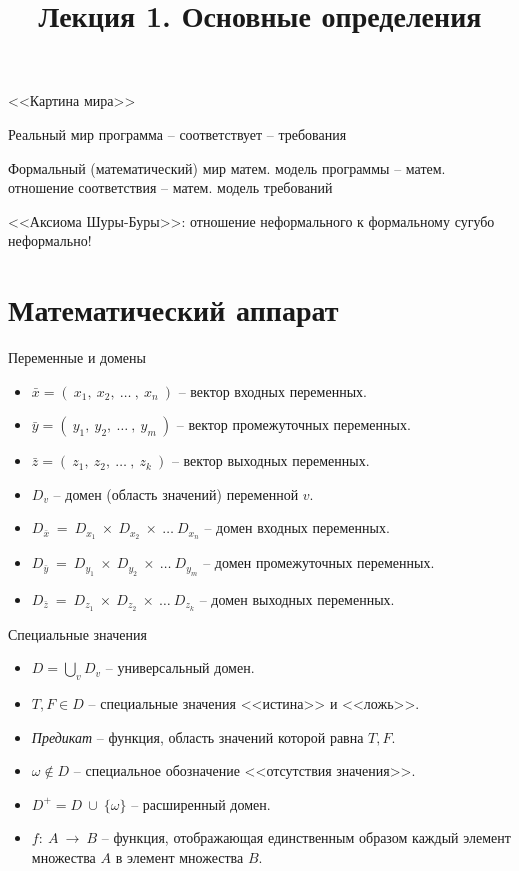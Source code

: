 \documentclass{beamer}
\title{Лекция 1. Основные определения}
\author{}
\date{}
\begin{document}
	\begin{frame}
		\titlepage
	\end{frame}

	\begin{frame}{<<Картина мира>>}
		\begin{block}{Реальный мир}
			программа -- соответствует -- требования
		\end{block}

		\begin{block}{Формальный (математический) мир}
			матем. модель программы -- матем. отношение соответствия -- матем. модель требований
		\end{block}

        <<Аксиома Шуры-Буры>>: отношение неформального к формальному сугубо неформально!
	\end{frame}

	\section{Математический аппарат}

	\begin{frame}{Переменные и домены}
	\begin{itemize}
	\item $\bar{x} = (~x_1,~x_2,~\ldots~,~x_n~)$ -- вектор входных переменных.
	\item $\bar{y} = (~y_1,~y_2,~\ldots~,~y_m~)$ -- вектор промежуточных переменных.
	\item $\bar{z} = (~z_1,~z_2,~\ldots~,~z_k~)$ -- вектор выходных переменных.
	\item $D_v$ -- домен (область значений) переменной $v$.
	\item $D_{\bar{x}}~=~D_{x_1}~\times~D_{x_2}~\times~\ldots~D_{x_n}$ -- домен входных переменных.
	\item $D_{\bar{y}}~=~D_{y_1}~\times~D_{y_2}~\times~\ldots~D_{y_m}$ -- домен промежуточных переменных.
	\item $D_{\bar{z}}~=~D_{z_1}~\times~D_{z_2}~\times~\ldots~D_{z_k}$ -- домен выходных переменных.
	\end{itemize}
	\end{frame}

	\begin{frame}{Специальные значения}
	\begin{itemize}
	\item $D = \bigcup_{v} D_v$ -- универсальный домен.
	\item $T, F \in D$ -- специальные значения <<истина>> и <<ложь>>.
	\item \emph{Предикат} -- функция, область значений которой равна ${T, F}$.
	\item $\omega \notin D$ -- специальное обозначение <<отсутствия значения>>.
	\item $D^{+} = D ~\cup~ \{\omega\}$ -- расширенный домен.
    \item $f:~A~\rightarrow~B$ -- функция, отображающая единственным образом каждый элемент множества $A$ в элемент множества $B$.
	\end{itemize}
	\end{frame}
\end{document}
